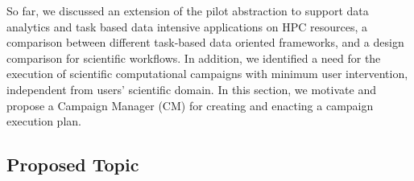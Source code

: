 \label{research}
So far, we discussed an extension of the pilot abstraction to support data analytics and task based data intensive applications on HPC resources, a comparison between different task-based data oriented frameworks, and a design comparison for scientific workflows.
In addition, we identified a need for the execution of scientific computational campaigns with minimum user intervention, independent from users' scientific domain.
In this section, we motivate and propose a Campaign Manager (CM) for creating and enacting a campaign execution plan. 


\subsection{Proposed Topic}


